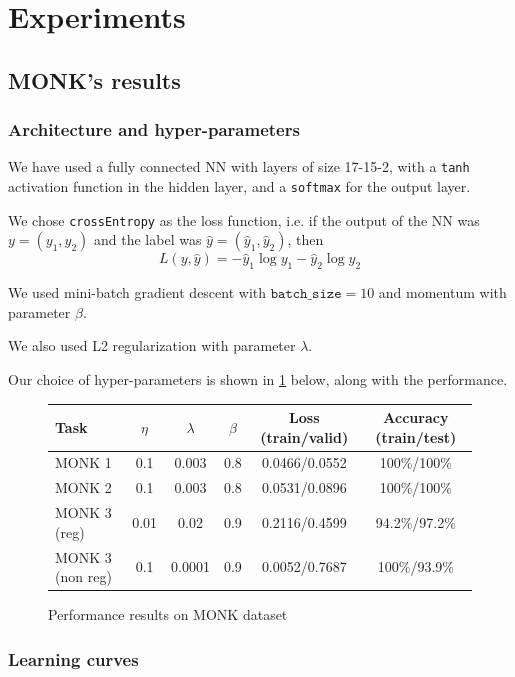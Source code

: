 \section{Experiments}

\subsection{MONK's results}

\subsubsection{Architecture and hyper-parameters}
We have used a fully connected NN with layers of size 17-15-2, with a \texttt{tanh} activation function in the hidden layer, and a \texttt{softmax} for the output layer.

We chose \texttt{crossEntropy} as the loss function, i.e. if the output of the NN was $y=(y_1,y_2)$ and the label was $\hat y=(\hat y_1,\hat y_2)$, then $$L(y,\hat y)=-\hat y_1\log y_1-\hat y_2\log y_2$$

We used mini-batch gradient descent with $\texttt{batch\_size}=10$ and momentum with parameter $\beta$.

We also used L2 regularization with parameter $\lambda$.

Our choice of hyper-parameters is shown in \cref{fig:hyper} below, along with the performance.

\begin{figure}[h]
    \begin{tabular}{|l|c|c|c|c|c|}
        \hline 
        Task & $\eta$ & $\lambda$ & $\beta$ & Loss (train/valid) & Accuracy (train/test) \\ \hline
        MONK 1 & 0.1 & 0.003 & 0.8 & 0.0466/0.0552  & 100\%/100\% \\ \hline
        MONK 2 & 0.1 & 0.003 & 0.8 & 0.0531/0.0896 & 100\%/100\% \\ \hline
        MONK 3 (reg) & 0.01 & 0.02 & 0.9 & 0.2116/0.4599 & 94.2\%/97.2\% \\ \hline
        MONK 3 (non reg) & 0.1 & 0.0001 & 0.9 & 0.0052/0.7687 & 100\%/93.9\% \\ \hline
    \end{tabular}
    \caption{Performance results on MONK dataset}
    \label{fig:hyper}
\end{figure}


\subsubsection{Learning curves}

